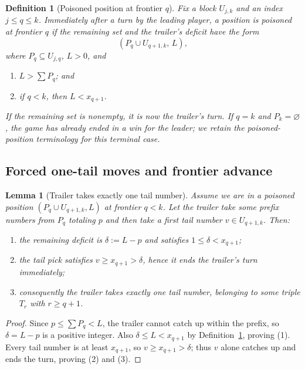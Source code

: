 \documentclass[11pt]{article}
\newtheorem{lemma}[theorem]{Lemma}
\newtheorem{definition}[theorem]{Definition}
\begin{document}
\begin{definition}[Poisoned position at frontier $q$]\label{def:poison}
Fix a block $U_{j,k}$ and an index $j\le q\le k$. Immediately after a turn by the leading player,
a position is \emph{poisoned at frontier $q$} if the remaining set and the trailer's deficit have the form
\[
(P_q\cup U_{q+1,k},\,L),
\]
where $P_q\subseteq U_{j,q}$, $L>0$, and
\begin{enumerate}
\item $L>\sum P_q$; and
\item if $q<k$, then $L<x_{q+1}$.
\end{enumerate}
If the remaining set is nonempty, it is now the trailer's turn. If $q=k$ and $P_k=\varnothing$,
the game has already ended in a win for the leader; we retain the poisoned-position terminology for this terminal case.
\end{definition}

\subsection{Forced one-tail moves and frontier advance}

\begin{lemma}[Trailer takes exactly one tail number]\label{lem:one-tail}
Assume we are in a poisoned position $(P_q\cup U_{q+1,k},L)$ at frontier $q<k$.
Let the trailer take some prefix numbers from $P_q$ totaling $p$ and then take a first tail number $v\in U_{q+1,k}$.
Then:
\begin{enumerate}
\item the remaining deficit is $\delta:=L-p$ and satisfies $1\le \delta < x_{q+1}$;
\item the tail pick satisfies $v\ge x_{q+1}>\delta$, hence it ends the trailer's turn immediately;
\item consequently the trailer takes \emph{exactly one} tail number, belonging to some triple $T_r$ with $r\ge q+1$.
\end{enumerate}
\end{lemma}

\begin{proof}
Since $p\le \sum P_q<L$, the trailer cannot catch up within the prefix, so $\delta=L-p$ is a positive integer.
Also $\delta\le L<x_{q+1}$ by Definition~\ref{def:poison}, proving (1).
Every tail number is at least $x_{q+1}$, so $v\ge x_{q+1}>\delta$; thus $v$ alone catches up and ends the turn, proving (2) and (3).
\end{proof}
\end{document}
